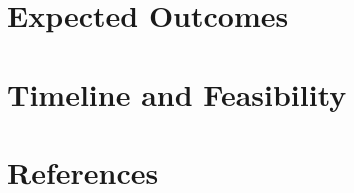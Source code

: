 \documentclass[12pt]{article}
\begin{document}

\section{Expected Outcomes}
\label{sec:outcomes}


\section{Timeline and Feasibility}
\label{sec:timeline}


\section{References}
\label{sec:references}




\end{document}
